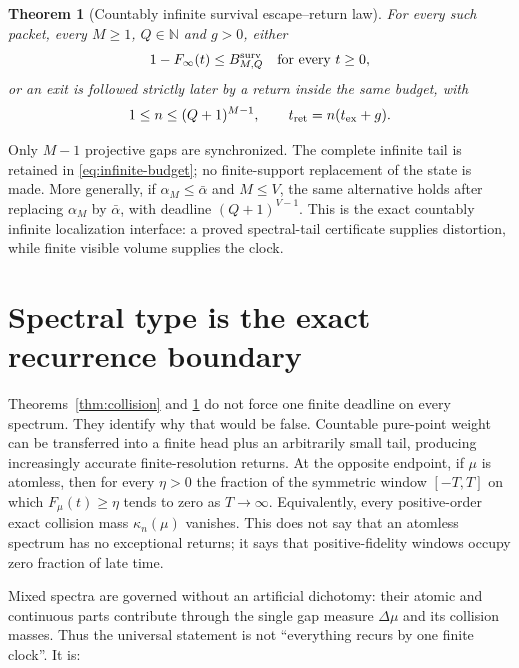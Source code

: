 \documentclass[10pt]{article}
\newtheorem{theorem}{Theorem}
\theoremstyle{definition}
\newcommand{\N}{\mathbb N}
\begin{document}
\begin{theorem}[Countably infinite survival escape--return law]
\label{thm:infinite}
For every such packet, every \(M\ge1\), \(Q\in\N\) and \(g>0\), either
\[
 1-F_\infty(t)\le B^{\rm surv}_{M,Q}
 \quad\text{for every }t\ge0,
\]
or an exit is followed strictly later by a return inside the same budget,
with
\[
 1\le n\le(Q+1)^{M-1},\qquad
 t_{\rm ret}=n(t_{\rm ex}+g).
\]
\end{theorem}

Only \(M-1\) projective gaps are synchronized. The complete infinite tail
is retained in \eqref{eq:infinite-budget}; no finite-support replacement of
the state is made. More generally, if \(\alpha_M\le\bar\alpha\) and
\(M\le V\), the same alternative holds after replacing \(\alpha_M\) by
\(\bar\alpha\), with deadline \((Q+1)^{V-1}\). This is the exact
countably infinite localization interface: a proved spectral-tail
certificate supplies distortion, while finite visible volume supplies the
clock.

\section*{Spectral type is the exact recurrence boundary}

Theorems~\ref{thm:collision} and \ref{thm:infinite} do not force one
finite deadline on every spectrum. They identify why that would be false.
Countable pure-point weight can be transferred into a finite head plus an
arbitrarily small tail, producing increasingly accurate finite-resolution
returns. At the opposite endpoint, if \(\mu\) is atomless, then for every
\(\eta>0\) the fraction of the symmetric window \([-T,T]\) on which
\(F_\mu(t)\ge\eta\) tends to zero as \(T\to\infty\). Equivalently, every
positive-order exact collision mass
\(\kappa_n(\mu)\) vanishes. This does not say that an atomless spectrum has
no exceptional returns; it says that positive-fidelity windows occupy zero
fraction of late time.

Mixed spectra are governed without an artificial dichotomy: their atomic
and continuous parts contribute through the single gap measure
\(\Delta\mu\) and its collision masses. Thus the universal statement is not
``everything recurs by one finite clock''. It is:
\begin{center}
\end{center}
\end{document}
